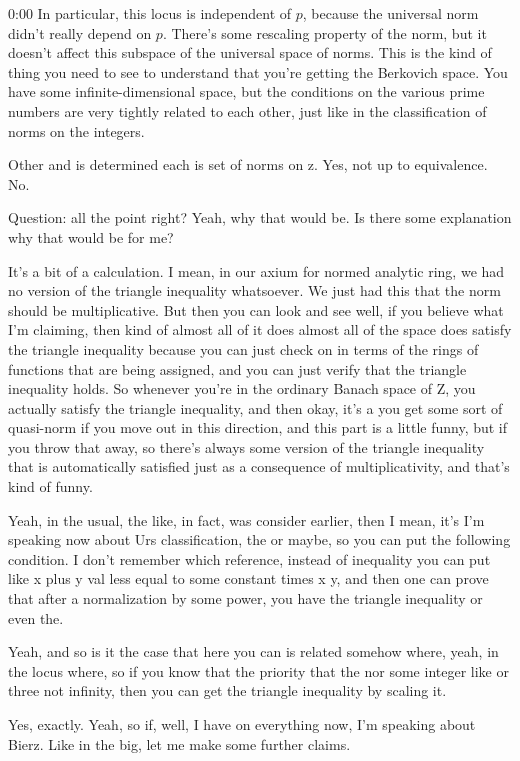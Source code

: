\begin{unfinished}{0:00}
In particular, this locus is independent of $p$, because the universal norm didn't really depend on $p$. There's some rescaling property of the norm, but it doesn't affect this subspace of the universal space of norms. This is the kind of thing you need to see to understand that you're getting the Berkovich space. You have some infinite-dimensional space, but the conditions on the various prime numbers are very tightly related to each other, just like in the classification of norms on the integers.

Other and is determined each is set of norms on z. Yes, not up to equivalence. No.

Question: all the point right? Yeah, why that would be. Is there some explanation why that would be for me?

It's a bit of a calculation. I mean, in our axium for normed analytic ring, we had no version of the triangle inequality whatsoever. We just had this that the norm should be multiplicative. But then you can look and see well, if you believe what I'm claiming, then kind of almost all of it does almost all of the space does satisfy the triangle inequality because you can just check on in terms of the rings of functions that are being assigned, and you can just verify that the triangle inequality holds. So whenever you're in the ordinary Banach space of Z, you actually satisfy the triangle inequality, and then okay, it's a you get some sort of quasi-norm if you move out in this direction, and this part is a little funny, but if you throw that away, so there's always some version of the triangle inequality that is automatically satisfied just as a consequence of multiplicativity, and that's kind of funny.

Yeah, in the usual, the like, in fact, was consider earlier, then I mean, it's I'm speaking now about Urs classification, the or maybe, so you can put the following condition. I don't remember which reference, instead of inequality you can put like x plus y val less equal to some constant times x y, and then one can prove that after a normalization by some power, you have the triangle inequality or even the.

Yeah, and so is it the case that here you can is related somehow where, yeah, in the locus where, so if you know that the priority that the nor some integer like or three not infinity, then you can get the triangle inequality by scaling it.

Yes, exactly. Yeah, so if, well, I have on everything now, I'm speaking about Bierz. Like in the big, let me make some further claims.


\end{unfinished}
